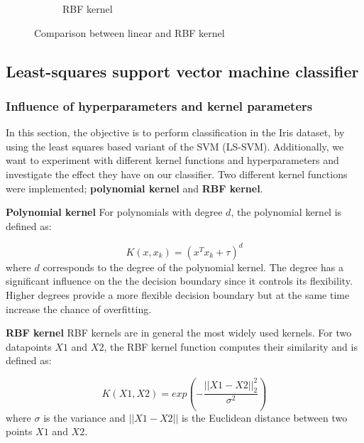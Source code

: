 \documentclass[a4paper, 11pt, one column]{article}
\begin{document}
\begin{figure}[]
\begin{subfigure}{0.4\linewidth}
        \caption{RBF kernel}
    \end{subfigure}
    \caption{Comparison between linear and RBF kernel}
    \label{fig:lin_RBF_comparison}
\end{figure}

\subsection{Least-squares support vector machine classifier}
\subsubsection{Influence of hyperparameters and kernel parameters}
In this section, the objective is to perform classification in the Iris dataset, by using the least squares based variant of the SVM (LS-SVM). Additionally, we want to experiment with different kernel functions and hyperparameters and investigate the effect they have on our classifier. Two different kernel functions were implemented; \textbf{polynomial kernel} and \textbf{RBF kernel}.

\textbf{Polynomial kernel} For polynomials with degree $d$, the polynomial kernel is defined as: 

\begin{equation}
K(x,x_k) = (x^Tx_k +\tau)^d
\end{equation} 
where $d$ corresponds to the degree of the polynomial kernel. The degree has a significant influence on the the decision boundary since it controls its flexibility. Higher degrees provide a more flexible decision boundary but at the same time increase the chance of overfitting. 

\textbf{RBF kernel}
RBF kernels are in general the most widely used kernels. For two datapoints $X1$ and $X2$, the RBF kernel function computes their similarity and is defined as:

\begin{equation}
K(X1,X2) = exp(-\frac{||X1-X2||^2_2}{\sigma^2})
\end{equation}
where $\sigma$ is the variance and $||X1-X2||$ is the Euclidean distance between two points $X1$ and $X2$.
\end{document}
